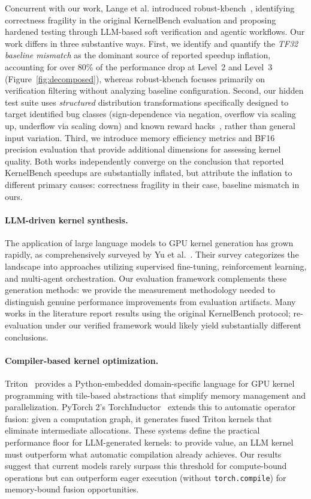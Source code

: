 \documentclass[]{fairmeta}
\begin{document}
Concurrent with our work, Lange et al. introduced robust-kbench~\citep{robustkbench}, identifying correctness fragility in the original KernelBench evaluation and proposing hardened testing through LLM-based soft verification and agentic workflows.
Our work differs in three substantive ways. First, we identify and quantify the \emph{TF32 baseline mismatch} as the dominant source of reported speedup inflation, accounting for over 80\% of the performance drop at Level~2 and Level~3 (Figure~\ref{fig:decomposed}), whereas robust-kbench focuses primarily on verification filtering without analyzing baseline configuration.
Second, our hidden test suite uses \emph{structured} distribution transformations specifically designed to target identified bug classes (sign-dependence via negation, overflow via scaling up, underflow via scaling down) and known reward hacks~\citep{kernelarena2026resources}, rather than general input variation.
Third, we introduce memory efficiency metrics and BF16 precision evaluation that provide additional dimensions for assessing kernel quality.
Both works independently converge on the conclusion that reported KernelBench speedups are substantially inflated, but attribute the inflation to different primary causes: correctness fragility in their case, baseline mismatch in ours.

\paragraph{LLM-driven kernel synthesis.}
The application of large language models to GPU kernel generation has grown rapidly, as comprehensively surveyed by Yu et al.~\citep{yu2026automated}. Their survey categorizes the landscape into approaches utilizing supervised fine-tuning, reinforcement learning, and multi-agent orchestration.
Our evaluation framework complements these generation methods: we provide the measurement methodology needed to distinguish genuine performance improvements from evaluation artifacts.
Many works in the literature report results using the original KernelBench protocol;
re-evaluation under our verified framework would likely yield substantially different conclusions.

\paragraph{Compiler-based kernel optimization.}
Triton~\citep{triton} provides a Python-embedded domain-specific language for GPU kernel programming with tile-based abstractions that simplify memory management and parallelization.
PyTorch 2's TorchInductor~\citep{torchinductor} extends this to automatic operator fusion: given a computation graph, it generates fused Triton kernels that eliminate intermediate allocations.
These systems define the practical performance floor for LLM-generated kernels: to provide value, an LLM kernel must outperform what automatic compilation already achieves.
Our results suggest that current models rarely surpass this threshold for compute-bound operations but can outperform eager execution (without \texttt{torch.compile}) for memory-bound fusion opportunities.
\end{document}
